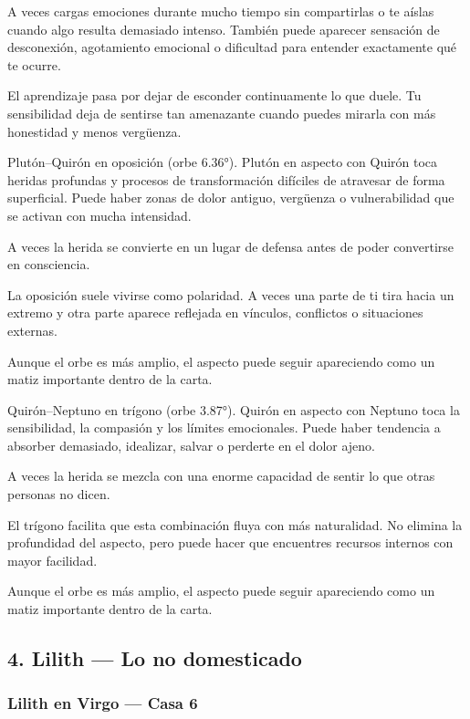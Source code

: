 \documentclass[11pt,a4paper]{article}
\begin{document}
A veces cargas emociones durante mucho tiempo sin compartirlas o te aíslas cuando algo resulta demasiado intenso. También puede aparecer sensación de desconexión, agotamiento emocional o dificultad para entender exactamente qué te ocurre.

El aprendizaje pasa por dejar de esconder continuamente lo que duele. Tu sensibilidad deja de sentirse tan amenazante cuando puedes mirarla con más honestidad y menos vergüenza.

Plutón–Quirón en oposición (orbe 6.36°).
Plutón en aspecto con Quirón toca heridas profundas y procesos de transformación difíciles de atravesar de forma superficial. Puede haber zonas de dolor antiguo, vergüenza o vulnerabilidad que se activan con mucha intensidad.

A veces la herida se convierte en un lugar de defensa antes de poder convertirse en consciencia.

La oposición suele vivirse como polaridad. A veces una parte de ti tira hacia un extremo y otra parte aparece reflejada en vínculos, conflictos o situaciones externas.

Aunque el orbe es más amplio, el aspecto puede seguir apareciendo como un matiz importante dentro de la carta.

Quirón–Neptuno en trígono (orbe 3.87°).
Quirón en aspecto con Neptuno toca la sensibilidad, la compasión y los límites emocionales. Puede haber tendencia a absorber demasiado, idealizar, salvar o perderte en el dolor ajeno.

A veces la herida se mezcla con una enorme capacidad de sentir lo que otras personas no dicen.

El trígono facilita que esta combinación fluya con más naturalidad. No elimina la profundidad del aspecto, pero puede hacer que encuentres recursos internos con mayor facilidad.

Aunque el orbe es más amplio, el aspecto puede seguir apareciendo como un matiz importante dentro de la carta.

\vspace{0.4cm}

\subsection{4. Lilith — Lo no domesticado}

\subsubsection*{Lilith en Virgo — Casa 6}
\end{document}
